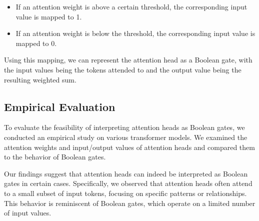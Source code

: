 \begin{itemize}






\item If an attention weight is above a certain threshold, the corresponding input value is mapped to 1.






\item If an attention weight is below the threshold, the corresponding input value is mapped to 0.






\end{itemize}













Using this mapping, we can represent the attention head as a Boolean gate, with the input values being the tokens attended to and the output value being the resulting weighted sum.













\subsection{Empirical Evaluation}













To evaluate the feasibility of interpreting attention heads as Boolean gates, we conducted an empirical study on various transformer models. We examined the attention weights and input/output values of attention heads and compared them to the behavior of Boolean gates.













Our findings suggest that attention heads can indeed be interpreted as Boolean gates in certain cases. Specifically, we observed that attention heads often attend to a small subset of input tokens, focusing on specific patterns or relationships. This behavior is reminiscent of Boolean gates, which operate on a limited number of input values.













